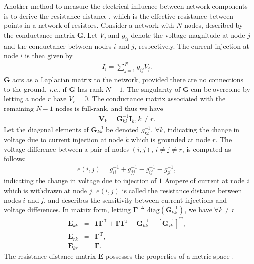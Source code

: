 \documentclass[10pt,journal,twocolumn]{IEEEtran}\IEEEoverridecommandlockouts
\newcommand{\ie}{{\em i.e.}}
\begin{document}
Another method to measure the electrical influence between network components is to derive the resistance distance \cite{Klein1993}, which is the effective resistance between points in a network of resistors. Consider a network with $N$ nodes, described by the conductance matrix $\bm{G}$. Let $V_j$ and $g_{ij}$ denote the voltage magnitude at node $j$ and the conductance between nodes $i$ and $j$, respectively. The current injection at node $i$ is then given by
\begin{eqnarray}\label{eq:current_injection}
I_i = \sum_{j=1}^{N}g_{ij}V_j.
\end{eqnarray}
$\bm{G}$ acts as a Laplacian matrix to the network, provided there are no connections to the ground, {\ie}, if $\bm{G}$ has rank $N-1$. The singularity of $\bm{G}$ can be overcome by letting a node $r$ have $V_r = 0$. The conductance matrix associated with the remaining $N-1$ nodes is full-rank, and thus we have
\begin{eqnarray}\label{eq:nonreferencenodes}
\bm{V}_k = \bm{G}^{-1}_{kk}\bm{I}_k, k \neq r.
\end{eqnarray}
Let the diagonal elements of $\bm{G}^{-1}_{kk}$ be denoted $g^{-1}_{kk}$, $\forall k$, indicating the change in voltage due to current injection at node $k$ which is grounded at node $r$. The voltage difference between a pair of nodes $(i,j)$, $i\neq j\neq r$, is computed as follows:
\begin{eqnarray}\label{eq:voltage_difference}
e(i,j) = g^{-1}_{ii} + g^{-1}_{jj} - g^{-1}_{ij} - g^{-1}_{ji},
\end{eqnarray}
indicating the change in voltage due to injection of $1$ Ampere of current at node $i$ which is withdrawn at node $j$. $e(i,j)$ is called the resistance distance between nodes $i$ and $j$, and describes the sensitivity between current injections and voltage differences. In matrix form, letting $\boldsymbol{\Gamma} \triangleq \text{diag}(\bm{G}^{-1}_{kk})$, we have $\forall k \neq r$
\begin{eqnarray}\label{eq:matrix_form}
\bm{E}_{kk} &=& \boldsymbol{1}\boldsymbol{\Gamma}^{\mathrm{T}} + \boldsymbol{\Gamma}\boldsymbol{1}^{\mathrm{T}} - \bm{G}^{-1}_{kk} - \left[\bm{G}^{-1}_{kk}\right]^{\mathrm{T}},\\
\bm{E}_{rk} &=& \boldsymbol{\Gamma}^{\mathrm{T}},\\
\bm{E}_{kr} &=& \boldsymbol{\Gamma}.
\end{eqnarray}
The resistance distance matrix $\bm{E}$ possesses the properties of a metric space \cite{Klein1993}.
\end{document}
